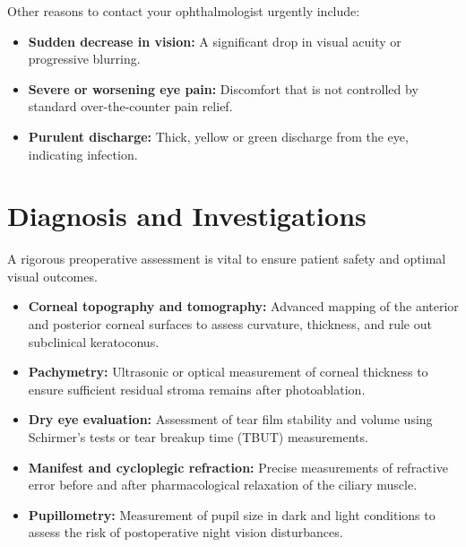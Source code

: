 Other reasons to contact your ophthalmologist urgently include:
\begin{itemize}
    \item \textbf{Sudden decrease in vision:} A significant drop in visual acuity or progressive blurring.
    \item \textbf{Severe or worsening eye pain:} Discomfort that is not controlled by standard over-the-counter pain relief.
    \item \textbf{Purulent discharge:} Thick, yellow or green discharge from the eye, indicating infection.
\end{itemize}

\section*{Diagnosis and Investigations}
A rigorous preoperative assessment is vital to ensure patient safety and optimal visual outcomes.
\begin{itemize}
    \item \textbf{Corneal topography and tomography:} Advanced mapping of the anterior and posterior corneal surfaces to assess curvature, thickness, and rule out subclinical keratoconus.
    \item \textbf{Pachymetry:} Ultrasonic or optical measurement of corneal thickness to ensure sufficient residual stroma remains after photoablation.
    \item \textbf{Dry eye evaluation:} Assessment of tear film stability and volume using Schirmer's tests or tear breakup time (TBUT) measurements.
    \item \textbf{Manifest and cycloplegic refraction:} Precise measurements of refractive error before and after pharmacological relaxation of the ciliary muscle.
    \item \textbf{Pupillometry:} Measurement of pupil size in dark and light conditions to assess the risk of postoperative night vision disturbances.
\end{itemize}

